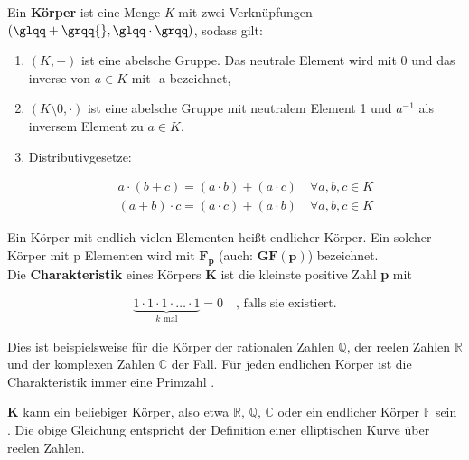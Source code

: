 Ein \textbf{Körper} ist eine Menge \textit{K} mit zwei
Verknüpfungen \((\glqq + \grqq{},\glqq \cdot \grqq)\), sodass gilt:
\begin{enumerate}
    \item \((\textit{K}, +)\) ist eine abelsche Gruppe. Das neutrale
    Element wird mit 0 und das inverse von \(a \in \textit{K}\)  mit -a bezeichnet, 
    \item \((\textit{K}\setminus 0, \cdot)\) ist eine abelsche Gruppe mit neutralem Element 1 und $ a^{-1} $ als inversem Element zu \(a \in \textit{K}\).
    \item Distributivgesetze:
    \begin{ceqn}
     \begin{align*}
          a \cdot (b + c ) = (a \cdot b) + (a \cdot c) \quad \forall a, b, c \in \textit{K} \\
         (a + b) \cdot c = (a \cdot c) + (a \cdot b) \quad \forall a, b, c \in \textit{K}
     \end{align*}
    \end{ceqn}
    
\end{enumerate} 
Ein Körper mit endlich vielen Elementen heißt endlicher Körper. Ein solcher Körper mit p Elementen wird mit $ \mathbf{F_p}$ (auch:
$ \mathbf{GF(p)} $) bezeichnet.\\

Die \textbf{Charakteristik} eines Körpers $ \mathbf{K} $ ist die kleinste positive Zahl \textbf{p} mit 
\begin{ceqn}
\begin{align*}
   \underbrace{1 \cdot 1 \cdot 1 \cdot \ldots \cdot 1}_{\text{$k$ mal} } = 0   \quad \text{, falls sie existiert.}
\end{align*}
\end{ceqn}
 
Dies ist beispielsweise für die Körper der rationalen Zahlen $ \mathbb{Q} $, der reelen Zahlen $ \mathbb{R} $ und der komplexen Zahlen $\mathbb{C} $ der Fall. Für jeden endlichen Körper ist die Charakteristik immer eine Primzahl \cite{damer}.

$ \mathbf{K} $ kann ein beliebiger Körper, also etwa $ \mathbb{R} $, $ \mathbb{Q} $, $ \mathbb{C} $ oder ein endlicher Körper $ \mathbb{F} $ sein \cite{werner}. Die obige Gleichung entspricht der Definition einer elliptischen Kurve über reelen Zahlen.\\

